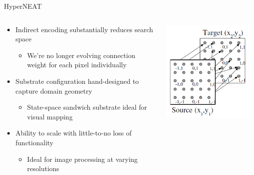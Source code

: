 \documentclass[xcolor=dvipsnames]{beamer}
\newcommand\Fontvi{\fontsize{7}{10}\selectfont}
\begin{document}
	\begin{frame}{HyperNEAT}
		\begin{columns}[T]
			\begin{column}{.5\textwidth}
				\begin{itemize}
					\item Indirect encoding substantially reduces search space
					\begin{itemize}\Fontvi
						\item We're no longer evolving connection weight for each pixel individually
					\end{itemize}
					\item Substrate configuration hand-designed to capture domain geometry
					\begin{itemize}\Fontvi
						\item State-space sandwich substrate ideal for visual mapping
					\end{itemize}
					\item Ability to scale with little-to-no loss of functionality 
					\begin{itemize}\Fontvi
						\item Ideal for image processing at varying resolutions
					\end{itemize}					
				\end{itemize}
			\end{column}
			\begin{column}{.5\textwidth}
				\includegraphics[width=\textwidth]{StateSpaceSandwichSubstrate}
			\end{column}
		\end{columns}			
	\end{frame}
	
\end{document}
